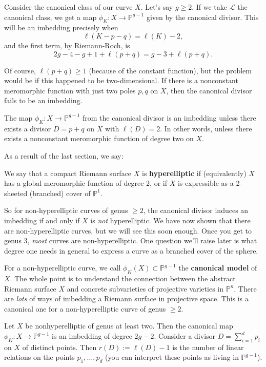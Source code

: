 \documentclass[12pt]{article}
\begin{document}
Consider the canonical class of our curve $X$. Let's say $g \geq 2$. If we take $\mathcal{L}$ the canonical class, we get a map $\phi_K : X \to \mathbb{P}^{g-1}$ given by the canonical divisor. This will be an imbedding precisely when
$$\ell(K - p - q) = \ell(K) - 2,$$
and the first term, by Riemann-Roch, is
$$2g - 4 - g + 1 + \ell(p + q) = g - 3 + \ell(p + q).$$

Of course, $\ell(p + q) \geq 1$ (because of the constant function), but the problem would be if this happened to be two-dimensional. If there is a nonconstant meromorphic function with just two poles $p, q$ on $X$, then the canonical divisor fails to be an imbedding. 

\begin{corollary}
    The map $\phi_K : X \to \mathbb{P}^{g-1}$ from the canonical divisor is an imbedding unless there exists a divisor $D = p + q$ on $X$ with $\ell(D) = 2$. In other words, unless there exists a nonconstant meromorphic function of degree two on $X$.
\end{corollary}

As a result of the last section, we say:

\begin{definition}
    We say that a compact Riemann surface $X$ is \textbf{hyperelliptic} if (equivalently) $X$ has a global meromorphic function of degree 2, or if $X$ is expressible as a 2-sheeted (branched) cover of $\mathbb{P}^1$.
\end{definition}

So for non-hyperelliptic curves of genus $\geq 2$, the canonical divisor induces an imbedding if and only if $X$ is \textit{not} hyperelliptic. We have now shown that there are non-hyperelliptic curves, but we will see this soon enough. Once you get to genus 3, \textit{most} curves are non-hyperelliptic. One question we'll raise later is what degree one needs in general to express a curve as a branched cover of the sphere.

For a non-hyperelliptic curve, we call $\phi_K(X) \subset \mathbb{P}^{g-1}$ the \textbf{canonical model} of $X$. The whole point is to understand the connection between the abstract Riemann surface $X$ and concrete subvarieties of projective varieties in $\mathbb{P}^n$. There are \textit{lots} of ways of imbedding a Riemann surface in projective space. This is a canonical one for a non-hyperelliptic curve of genus $\geq 2$.

\begin{theorem}
    Let $X$ be nonhyperelliptic of genus at least two. Then the canonical map $\phi_K : X \to \mathbb{P}^{g-1}$ is an imbedding of degree $2g - 2$. Consider a divisor $D = \sum_{i=1}^d p_i$ on $X$ of distinct points. Then $r(D):= \ell(D) - 1$ is the number of linear relations on the points $p_1,\dots,p_d$ (you can interpret these points as living in $\mathbb{P}^{g-1}$).
\end{theorem}
\end{document}
